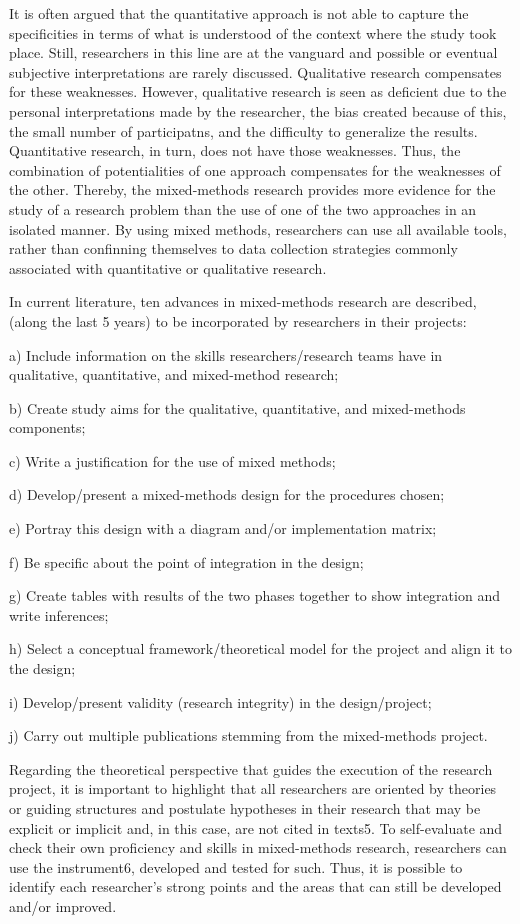 It is often argued that the quantitative approach is not able to capture the specificities in terms of what is understood of the context where the study  took place. Still, researchers in this line are at the vanguard and possible or eventual subjective interpretations are rarely discussed. Qualitative research compensates for these weaknesses. However, qualitative research is seen as deficient due to the personal interpretations made by the researcher, the bias created because of this, the small number of participatns, and the difficulty to generalize the results. Quantitative research, in turn, does not have those weaknesses. Thus, the combination of potentialities of one approach compensates for the weaknesses of the other. Thereby, the mixed-methods research provides more evidence for the study of a research problem than the use of one of the two approaches in an isolated manner. By using mixed methods, researchers can use all available tools, rather  than confinning themselves to data collection strategies commonly associated with quantitative or qualitative research. 

In current literature, ten advances in mixed-methods research are described, (along the last 5 years) to be incorporated by researchers in their projects:

a) Include information on the skills researchers/research teams have in qualitative, quantitative, and mixed-method research;

b) Create study aims for the qualitative, quantitative, and mixed-methods components;

c) Write a justification for the use of mixed methods;

d) Develop/present a mixed-methods design for the procedures chosen;

e) Portray this design with a diagram and/or implementation matrix;

f) Be specific about the point of integration in the design;

g) Create tables with results of the two phases together to show integration and write inferences;

h) Select a conceptual framework/theoretical model for the project and align it to the design;

i) Develop/present validity (research integrity) in the design/project;

j) Carry out multiple publications stemming from the mixed-methods project.

Regarding the theoretical perspective that guides the execution of the research project, it is important to highlight that all researchers are oriented by theories or guiding structures and postulate hypotheses in their research that may be explicit or implicit and, in this case, are not cited in texts5. To self-evaluate and check their own proficiency and skills in mixed-methods research, researchers can use the instrument6, developed and tested for such. Thus, it is possible to identify each researcher’s strong points and the areas that can still be developed and/or improved.

